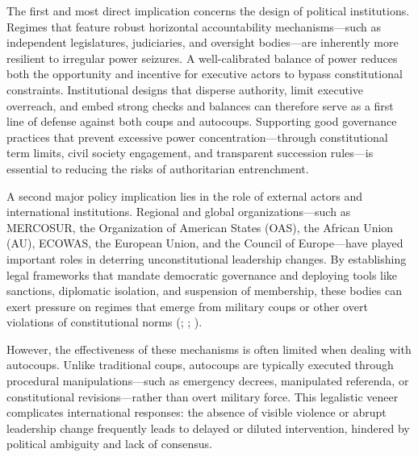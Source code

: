 \documentclass[
  12pt,
]{report}
\begin{document}
The first and most direct implication concerns the design of political
institutions. Regimes that feature robust horizontal accountability
mechanisms---such as independent legislatures, judiciaries, and
oversight bodies---are inherently more resilient to irregular power
seizures. A well-calibrated balance of power reduces both the
opportunity and incentive for executive actors to bypass constitutional
constraints. Institutional designs that disperse authority, limit
executive overreach, and embed strong checks and balances can therefore
serve as a first line of defense against both coups and autocoups.
Supporting good governance practices that prevent excessive power
concentration---through constitutional term limits, civil society
engagement, and transparent succession rules---is essential to reducing
the risks of authoritarian entrenchment.

A second major policy implication lies in the role of external actors
and international institutions. Regional and global organizations---such
as MERCOSUR, the Organization of American States (OAS), the African
Union (AU), ECOWAS, the European Union, and the Council of Europe---have
played important roles in deterring unconstitutional leadership changes.
By establishing legal frameworks that mandate democratic governance and
deploying tools like sanctions, diplomatic isolation, and suspension of
membership, these bodies can exert pressure on regimes that emerge from
military coups or other overt violations of constitutional norms
(;
;
).

However, the effectiveness of these mechanisms is often limited when
dealing with autocoups. Unlike traditional coups, autocoups are
typically executed through procedural manipulations---such as emergency
decrees, manipulated referenda, or constitutional revisions---rather
than overt military force. This legalistic veneer complicates
international responses: the absence of visible violence or abrupt
leadership change frequently leads to delayed or diluted intervention,
hindered by political ambiguity and lack of consensus.
\end{document}
